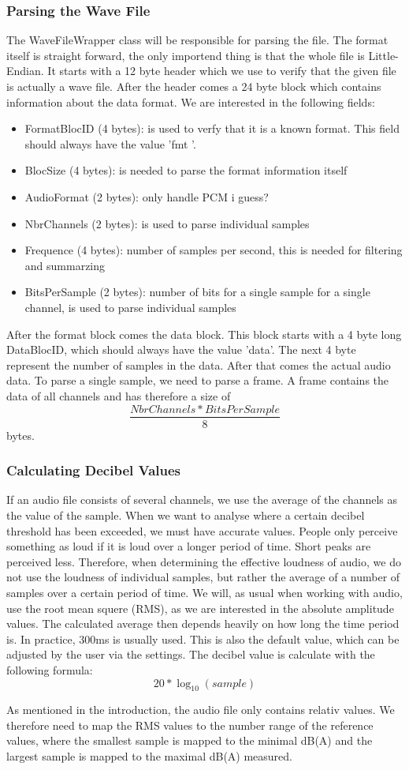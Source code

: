 \subsubsection{Parsing the Wave File}
The WaveFileWrapper class will be responsible for parsing the file. The format itself is straight forward\cite{wav_file_format_wikipedia}, the only importend thing is that the whole file is Little-Endian. It starts with a 12 byte header which we use to verify that the given file is actually a wave file. After the header comes a 24 byte block which contains information about the data format. We are interested in the following fields:
\begin{itemize}
    \item FormatBlocID (4 bytes): is used to verfy that it is a known format. This field should always have the value 'fmt '.
    \item BlocSize (4 bytes): is needed to parse the format information itself 
    \item AudioFormat (2 bytes): only handle PCM i guess?
    \item NbrChannels (2 bytes): is used to parse individual samples
    \item Frequence (4 bytes): number of samples per second, this is needed for filtering and summarzing 
    \item BitsPerSample (2 bytes): number of bits for a single sample for a single channel, is used to parse individual samples
\end{itemize}
After the format block comes the data block. This block starts with a 4 byte long DataBlocID, which should always have the value 'data'. The next 4 byte represent the number of samples in the data. After that comes the actual audio data. To parse a single sample, we need to parse a frame. A frame contains the data of all channels and has therefore a size of \[\frac{NbrChannels * BitsPerSample}{8}\] bytes. 

\subsubsection{Calculating Decibel Values}
If an audio file consists of several channels, we use the average of the channels as the value of the sample.
When we want to analyse where a certain decibel threshold has been exceeded, we must have accurate values. People only perceive something as loud if it is loud over a longer period of time. Short peaks are perceived less. Therefore, when determining the effective loudness of audio, we do not use the loudness of individual samples, but rather the average of a number of samples over a certain period of time. We will, as usual when working with audio, use the root mean squere (RMS), as we are interested in the absolute amplitude values.
The calculated average then depends heavily on how long the time period is. In practice, 300ms is usually used\cite{timespan_for_audio_rms_calculate}. This is also the default value, which can be adjusted by the user via the settings.
The decibel value is calculate with the following formula\cite{decibel_wikipedia}:
\[20 * \log_{10} (sample)\] 

As mentioned in the introduction, the audio file only contains relativ values. We therefore need to map the RMS values to the number range of the reference values, where the smallest sample is mapped to the minimal dB(A) and the largest sample is mapped to the maximal dB(A) measured. 
